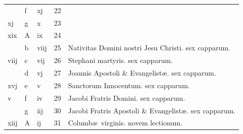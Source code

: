 \documentclass[letter,11pt]{book}
\begin{document}
\begin{center}
\begin{tabular}{l | l | l | r | l}
\color{Red}  & f & \color{Red} xj & 22 & \\
\color{Red} xj & g & \color{Red} x & 23 & \\
\color{Red} xix & \color{Red} A & \color{Red} ix & 24 & \\
\color{Red}  & b & \color{Red} viij & 25 & \color{Red} Nativitas Domini nostri Jesu Christi. \color{black} sex capparum. \\
\color{Red} viij & c & \color{Red} vij & 26 & \color{Red} Stephani martyris. \color{black} sex capparum. \\
\color{Red}  & d & \color{Red} vj & 27 & \color{Red} Joannis Apostoli \& Evangelist\ae . \color{black} sex capparum. \\
\color{Red} xvj & e & \color{Red} v & 28 & \color{Red} Sanctorum Innocentum. \color{black} sex capparum. \\
\color{Red} v & f & \color{Red} iv & 29 & Jacobi Fratris Domini. \color{Red} sex capparum. \\
\color{Red}  & g & \color{Red} iij & 30 & Jacobi Fratris Apostoli \& Evangelist\ae . \color{Red} sex capparum. \\
\color{Red} xiij & \color{Red} A & \color{Red} ij & 31 & Columb\ae \ virginis. \color{Red} novem lectionum. \\
\end{tabular}
\end{center}



\newpage
{}
\thispagestyle{empty}
\end{document}
